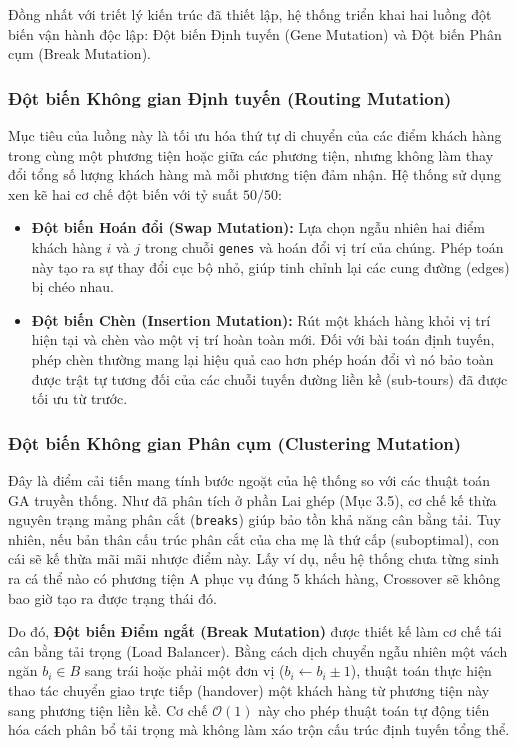 \documentclass[12pt,a4paper]{article}
\numberwithin{figure}{subsection}
\numberwithin{table}{subsection}
\begin{document}
Đồng nhất với triết lý kiến trúc đã thiết lập, hệ thống triển khai hai luồng đột biến vận hành độc lập: Đột biến Định tuyến (Gene Mutation) và Đột biến Phân cụm (Break Mutation).

\subsubsection{Đột biến Không gian Định tuyến (Routing Mutation)}

Mục tiêu của luồng này là tối ưu hóa thứ tự di chuyển của các điểm khách hàng trong cùng một phương tiện hoặc giữa các phương tiện, nhưng không làm thay đổi tổng số lượng khách hàng mà mỗi phương tiện đảm nhận. Hệ thống sử dụng xen kẽ hai cơ chế đột biến với tỷ suất $50/50$:
\begin{itemize}[label={ $\circ$}, leftmargin=1.5cm]
    \item \textbf{Đột biến Hoán đổi (Swap Mutation):} Lựa chọn ngẫu nhiên hai điểm khách hàng $i$ và $j$ trong chuỗi \texttt{genes} và hoán đổi vị trí của chúng. Phép toán này tạo ra sự thay đổi cục bộ nhỏ, giúp tinh chỉnh lại các cung đường (edges) bị chéo nhau.
    \item \textbf{Đột biến Chèn (Insertion Mutation):} Rút một khách hàng khỏi vị trí hiện tại và chèn vào một vị trí hoàn toàn mới. Đối với bài toán định tuyến, phép chèn thường mang lại hiệu quả cao hơn phép hoán đổi vì nó bảo toàn được trật tự tương đối của các chuỗi tuyến đường liền kề (sub-tours) đã được tối ưu từ trước.
\end{itemize}

\subsubsection{Đột biến Không gian Phân cụm (Clustering Mutation)}

Đây là điểm cải tiến mang tính bước ngoặt của hệ thống so với các thuật toán GA truyền thống. Như đã phân tích ở phần Lai ghép (Mục 3.5), cơ chế kế thừa nguyên trạng mảng phân cắt (\texttt{breaks}) giúp bảo tồn khả năng cân bằng tải. Tuy nhiên, nếu bản thân cấu trúc phân cắt của cha mẹ là thứ cấp (suboptimal), con cái sẽ kế thừa mãi mãi nhược điểm này. Lấy ví dụ, nếu hệ thống chưa từng sinh ra cá thể nào có phương tiện A phục vụ đúng 5 khách hàng, Crossover sẽ không bao giờ tạo ra được trạng thái đó.

Do đó, \textbf{Đột biến Điểm ngắt (Break Mutation)} được thiết kế làm cơ chế tái cân bằng tải trọng (Load Balancer). Bằng cách dịch chuyển ngẫu nhiên một vách ngăn $b_i \in B$ sang trái hoặc phải một đơn vị ($b_i \gets b_i \pm 1$), thuật toán thực hiện thao tác chuyển giao trực tiếp (handover) một khách hàng từ phương tiện này sang phương tiện liền kề. Cơ chế $\mathcal{O}(1)$ này cho phép thuật toán tự động tiến hóa cách phân bổ tải trọng mà không làm xáo trộn cấu trúc định tuyến tổng thể.
\end{document}

